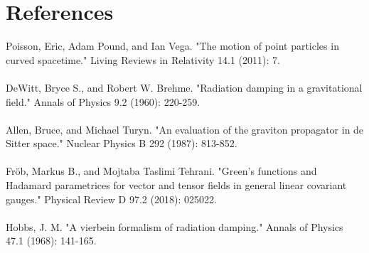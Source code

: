 \documentclass[10pt,letterpaper]{article}
\begin{document}
\section*{References}
Poisson, Eric, Adam Pound, and Ian Vega. "The motion of point particles in curved spacetime." Living Reviews in Relativity 14.1 (2011): 7.\\ \\
DeWitt, Bryce S., and Robert W. Brehme. "Radiation damping in a gravitational field." Annals of Physics 9.2 (1960): 220-259.\\ \\
Allen, Bruce, and Michael Turyn. "An evaluation of the graviton propagator in de Sitter space." Nuclear Physics B 292 (1987): 813-852.\\ \\
Fröb, Markus B., and Mojtaba Taslimi Tehrani. "Green’s functions and Hadamard parametrices for vector and tensor fields in general linear covariant gauges." Physical Review D 97.2 (2018): 025022. \\ \\
Hobbs, J. M. "A vierbein formalism of radiation damping." Annals of Physics 47.1 (1968): 141-165.
\end{document}
